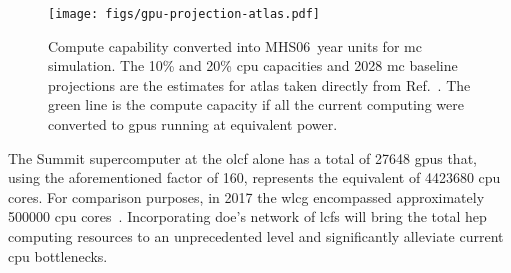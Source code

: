 \begin{figure}[h]
  \centering%
  \texttt{[image: figs/gpu-projection-atlas.pdf]}%
  \caption{Compute capability converted into \si{MHS06.year} units for \acs{mc}
  simulation. The 10\% and 20\% \ac{cpu} capacities and 2028 \acs{mc} baseline
  projections are the estimates for \acs{atlas} taken directly from
  Ref.~\cite{the_atlas_collaboration_atlas_2020}.  The green line is the compute
  capacity if all the current computing were converted to \acp{gpu} running at
  equivalent power.}%
  \label{fig:gpu-projection}
\end{figure}

The Summit supercomputer at the \ac{olcf} alone has a total of \num{27648}
\acp{gpu} that, using the aforementioned factor of 160, represents the
equivalent of \num{4423680} \ac{cpu} cores. For comparison purposes, in 2017 the
\ac{wlcg} encompassed approximately \num{500000} \ac{cpu}
cores~\cite{valassi_using_2020}. Incorporating \ac{doe}'s network of \acp{lcf}
will bring the total \ac{hep} computing resources to an unprecedented level and
significantly alleviate current \ac{cpu} bottlenecks.
